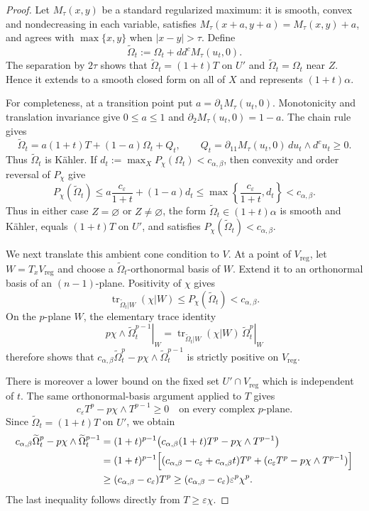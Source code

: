 \documentclass[reqno]{amsart}
\newcommand{\tr}{\operatorname{tr}}
\newcommand{\ddc}{dd^c}
\newcommand{\cab}{c_{\alpha,\beta}}
\newcommand{\reg}{\mathrm{reg}}
\theoremstyle{plain}
\theoremstyle{remark}
\begin{document}
\begin{proof}
Let $M_\tau(x,y)$ be a standard regularized maximum: it is smooth,
convex and nondecreasing in each variable, satisfies
$M_\tau(x+a,y+a)=M_\tau(x,y)+a$, and agrees with
$\max\{x,y\}$ when $|x-y|>\tau$.  Define
\[
 \widetilde\Omega_t
 :=\Omega_t+\ddc M_\tau(u_t,0).
\]
The separation by $2\tau$ shows that
$\widetilde\Omega_t=(1+t) T$ on $U'$ and
$\widetilde\Omega_t=\Omega_t$ near $Z$.  Hence it extends to
a smooth closed form on all of $X$ and represents $(1+t)\alpha$.

For completeness, at a transition point put
$a=\partial_1M_\tau(u_t,0)$.  Monotonicity and translation invariance
give $0\leq a\leq1$ and
$\partial_2M_\tau(u_t,0)=1-a$.  The chain rule gives
\[
 \widetilde\Omega_t
 =a(1+t)T+(1-a)\Omega_t+Q_t,
 \qquad
 Q_t=\partial_{11}M_\tau(u_t,0)\,du_t\wedge d^c u_t\geq0.
\]
Thus $\widetilde\Omega_t$ is K\"ahler. If
$d_t:=\max_X P_\chi(\Omega_t)<\cab$, then convexity and order reversal
of $P_\chi$ give
\[
 P_\chi(\widetilde\Omega_t)
 \leq a\frac{c_\varepsilon}{1+t}+(1-a)d_t
 \leq\max\left\{\frac{c_\varepsilon}{1+t},d_t\right\}<\cab.
\]
Thus in either case $Z=\varnothing$ or $Z\ne\varnothing$, the form
$\widetilde\Omega_t\in(1+t)\alpha$ is smooth and K\"ahler, equals
$(1+t)T$ on $U'$, and satisfies
$P_\chi(\widetilde\Omega_t)<\cab$.

We next translate this ambient cone condition to $V$.  At a point of
$V_{\reg}$, let $W=T_xV_{\reg}$ and choose a
$\widetilde\Omega_t$-orthonormal basis of $W$.  Extend it to an
orthonormal basis of an $(n-1)$-plane.  Positivity of $\chi$ gives
\[
 \tr_{\widetilde\Omega_t|W}(\chi|W)
 \leq P_\chi(\widetilde\Omega_t)<\cab.
\]
On the $p$-plane $W$, the elementary trace identity
\[
 \left.p\chi\wedge\widetilde\Omega_t^{p-1}\right|_W
 =\tr_{\widetilde\Omega_t|W}(\chi|W)\,
   \left.\widetilde\Omega_t^p\right|_W
\]
therefore shows that
$\cab\widetilde\Omega_t^p-p\chi\wedge
\widetilde\Omega_t^{p-1}$ is strictly positive on $V_{\reg}$.

There is moreover a lower bound on the fixed set
$U'\cap V_{\reg}$ which is independent of $t$.  The same
orthonormal-basis argument applied to $T$ gives
\[
 c_\varepsilon T^p-p\chi\wedge T^{p-1}\geq0
 \quad\text{on every complex }p\text{-plane}.
\]
Since $\widetilde\Omega_t=(1+t) T$ on $U'$, we obtain
\begin{align*}
 \cab\widetilde\Omega_t^p
   -p\chi\wedge\widetilde\Omega_t^{p-1}
 &=(1+t)^{p-1}
   \bigl(\cab(1+t) T^p-p\chi\wedge T^{p-1}\bigr)\\
 &=(1+t)^{p-1}\Bigl[
   (\cab-c_\varepsilon+\cab t)T^p
   +(c_\varepsilon T^p-p\chi\wedge T^{p-1})\Bigr]\\
 &\geq(\cab-c_\varepsilon)T^p
 \geq(\cab-c_\varepsilon)\varepsilon^p\chi^p.
\end{align*}
The last inequality follows directly from $T\geq\varepsilon\chi$.


\end{proof}
\end{document}
